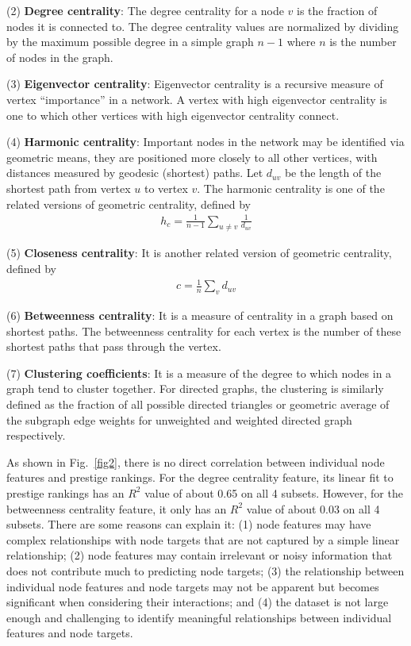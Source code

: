 \documentclass[journal]{IEEEtran}
\begin{document}
(2) \textbf{Degree centrality}: The degree centrality for a node $v$ is the fraction of nodes it is connected to. The degree centrality values are normalized by dividing by the maximum possible degree in a simple graph $n-1$ where $n$ is the number of nodes in the graph.

(3) \textbf{Eigenvector centrality}: Eigenvector centrality is a recursive measure of vertex “importance” in a network. A vertex with high eigenvector centrality is one to which other vertices with high
eigenvector centrality connect.

(4) \textbf{Harmonic centrality}: Important nodes in the network may be identified via geometric means, they are positioned more closely to all other vertices, with distances measured by geodesic (shortest) paths. Let $d_{uv}$ be the length of the shortest path from vertex $u$ to vertex $v$. The harmonic centrality is one of the related versions of geometric centrality, defined by
\begin{align}
h_c=\frac{1}{n-1} \sum_{u \neq v} \frac{1}{d_{u v}}
\end{align}

(5) \textbf{Closeness centrality}: It is another related version of geometric centrality, defined by
\begin{align}
c=\frac{1}{n} \sum_v d_{u v}
\end{align}

(6) \textbf{Betweenness centrality}: It is a measure of centrality in a graph based on shortest paths. The betweenness centrality for each vertex is the number of these shortest paths that pass through the vertex.

(7) \textbf{Clustering coefficients}: It is a measure of the degree to which nodes in a graph tend to cluster together. For directed graphs, the clustering is similarly defined as the fraction of all possible directed triangles or geometric average of the subgraph edge weights for unweighted and weighted directed graph respectively.

As shown in Fig.~\ref{fig2}, there is no direct correlation between individual node features and prestige rankings. For the degree centrality feature, its linear fit to prestige rankings has an $R^2$ value of about 0.65 on all 4 subsets. However, for the betweenness centrality feature, it only has an $R^2$ value of about 0.03 on all 4 subsets. There are some reasons can explain it: (1) node features may have complex relationships with node targets that are not captured by a simple linear relationship; (2) node features may contain irrelevant or noisy information that does not contribute much to predicting node targets; (3) the relationship between individual node features and node targets may not be apparent but becomes significant when considering their interactions; and (4) the dataset is not large enough and challenging to identify meaningful relationships between individual features and node targets.
\end{document}
